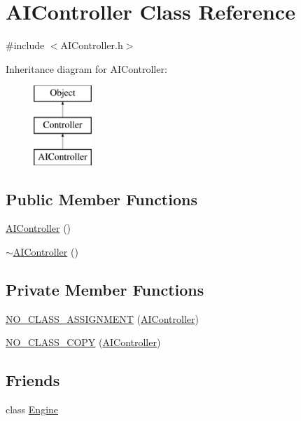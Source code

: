 \section{A\-I\-Controller Class Reference}
\label{class_a_i_controller}


{\ttfamily \#include $<$A\-I\-Controller.\-h$>$}

Inheritance diagram for A\-I\-Controller\-:\begin{figure}[H]
\begin{center}
\leavevmode
\includegraphics[height=3.000000cm]{class_a_i_controller}
\end{center}
\end{figure}
\subsection*{Public Member Functions}
\begin{DoxyCompactItemize}
\item 
\hyperlink{class_a_i_controller_a242d23b051987dce484a141955de1b79}{A\-I\-Controller} ()
\item 
\hyperlink{class_a_i_controller_a8ef6168b848152fb0758e339417122b3}{$\sim$\-A\-I\-Controller} ()
\end{DoxyCompactItemize}
\subsection*{Private Member Functions}
\begin{DoxyCompactItemize}
\item 
\hyperlink{class_a_i_controller_a728c585a4eb00012a6f779be0814beaa}{N\-O\-\_\-\-C\-L\-A\-S\-S\-\_\-\-A\-S\-S\-I\-G\-N\-M\-E\-N\-T} (\hyperlink{class_a_i_controller}{A\-I\-Controller})
\item 
\hyperlink{class_a_i_controller_ab173273df9dc5522244fd239610c17c0}{N\-O\-\_\-\-C\-L\-A\-S\-S\-\_\-\-C\-O\-P\-Y} (\hyperlink{class_a_i_controller}{A\-I\-Controller})
\end{DoxyCompactItemize}
\subsection*{Friends}
\begin{DoxyCompactItemize}
\item 
class \hyperlink{class_a_i_controller_a3e1914489e4bed4f9f23cdeab34a43dc}{Engine}
\end{DoxyCompactItemize}


